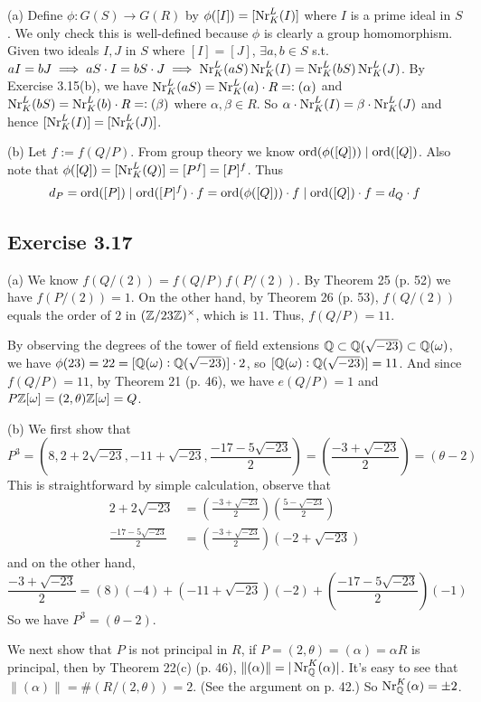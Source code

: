 \documentclass[../Marcus.tex]{subfiles}
\begin{document}
(a) Define $\phi:G(S)\to G(R)$ by $\phi([I])=[\operatorname{Nr}^L_K(I)]$ where $I$ is a prime ideal in $S$. We only check this is well-defined because $\phi$ is clearly a group homomorphism. Given two ideals $I,J$ in $S$ where $[I]=[J]$, $\exists a,b\in S$ s.t. $aI=bJ\implies aS\cdot I=bS\cdot J\implies \operatorname{Nr}^L_K(aS)\operatorname{Nr}^L_K(I)=\operatorname{Nr}^L_K(bS)\operatorname{Nr}^L_K(J)$. By Exercise 3.15(b), we have $\operatorname{Nr}^L_K(aS)=\operatorname{Nr}^L_K(a)\cdot R=:(\alpha)$ and $\operatorname{Nr}^L_K(bS)=\operatorname{Nr}^L_K(b)\cdot R=:(\beta)$ where $\alpha,\beta\in R$. So $\alpha\cdot\operatorname{Nr}^L_K(I)=\beta\cdot\operatorname{Nr}^L_K(J)$ and hence $[\operatorname{Nr}^L_K(I)]=[\operatorname{Nr}^L_K(J)]$.

(b) Let $f:=f(Q/P)$. From group theory we know $\operatorname{ord}(\phi([Q]))\mid \operatorname{ord}([Q])$. Also note that $\phi([Q])=[\operatorname{Nr}^L_K(Q)]=[P^f]=[P]^f$. Thus $$d_P=\operatorname{ord}([P])\mid \operatorname{ord}([P]^f)\cdot f = \operatorname{ord}(\phi([Q]))\cdot f\mid \operatorname{ord}([Q])\cdot f=d_Q\cdot f$$

\subsection*{Exercise 3.17}

(a) We know $f(Q/(2))=f(Q/P)f(P/(2))$. By Theorem 25 (p. 52) we have $f(P/(2))=1$. On the other hand, by Theorem 26 (p. 53), $f(Q/(2))$ equals the order of $2$ in $(\mathbb{Z}/23\mathbb{Z})^{\times}$, which is $11$. Thus, $f(Q/P)=11$.

By observing the degrees of the tower of field extensions $\mathbb{Q}\subset \mathbb{Q}(\sqrt{-23})\subset \mathbb{Q}(\omega)$, we have $\phi(23)=22=[\mathbb{Q}(\omega):\mathbb{Q}(\sqrt{-23})]\cdot 2$, so $[\mathbb{Q}(\omega):\mathbb{Q}(\sqrt{-23})]=11$. And since $f(Q/P)=11$, by Theorem 21 (p. 46), we have $e(Q/P)=1$ and $P\mathbb{Z}[\omega]=(2,\theta)\mathbb{Z}[\omega]=Q$.

(b) We first show that $$P^3=\left(8,2+2\sqrt{-23},-11+\sqrt{-23},\frac{-17-5\sqrt{-23}}{2}\right)=\left(\frac{-3+\sqrt{-23}}{2}\right)=(\theta-2)$$ This is straightforward by simple calculation, observe that
\begin{align*}
    2+2\sqrt{-23} &= \left(\frac{-3+\sqrt{-23}}{2}\right)\left(\frac{5-\sqrt{-23}}{2}\right) \\
    \frac{-17-5\sqrt{-23}}{2} &= \left(\frac{-3+\sqrt{-23}}{2}\right)(-2+\sqrt{-23})
\end{align*}
and on the other hand, $$\frac{-3+\sqrt{-23}}{2}=(8)(-4)+(-11+\sqrt{-23})(-2)+\left(\frac{-17-5\sqrt{-23}}{2}\right)(-1)$$ So we have $P^3=(\theta-2)$.

We next show that $P$ is not principal in $R$, if $P=(2,\theta)=(\alpha)=\alpha R$ is principal, then by Theorem 22(c) (p. 46), $\|(\alpha)\|=|\operatorname{Nr}^K_{\mathbb{Q}}(\alpha)|$. It's easy to see that $\|(\alpha)\|=\#(R/(2,\theta))=2$. (See the argument on p. 42.) So $\operatorname{Nr}^K_{\mathbb{Q}}(\alpha)=\pm 2$.
\end{document}
